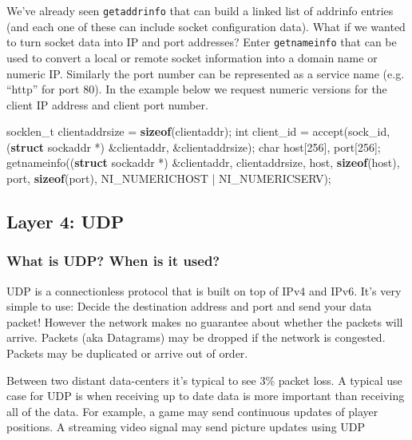 \documentclass[]{article}
\newenvironment{Shaded}{}{}
\newcommand{\KeywordTok}[1]{\textcolor[rgb]{0.00,0.44,0.13}{\textbf{{#1}}}}
\newcommand{\DataTypeTok}[1]{\textcolor[rgb]{0.56,0.13,0.00}{{#1}}}
\newcommand{\DecValTok}[1]{\textcolor[rgb]{0.25,0.63,0.44}{{#1}}}
\newcommand{\NormalTok}[1]{{#1}}
\begin{document}
We've already seen \texttt{getaddrinfo} that can build a linked list of
addrinfo entries (and each one of these can include socket configuration
data). What if we wanted to turn socket data into IP and port addresses?
Enter \texttt{getnameinfo} that can be used to convert a local or remote
socket information into a domain name or numeric IP. Similarly the port
number can be represented as a service name (e.g. ``http'' for port 80).
In the example below we request numeric versions for the client IP
address and client port number.

\begin{Shaded}
\begin{Highlighting}[]
\NormalTok{socklen_t clientaddrsize = }\KeywordTok{sizeof}\NormalTok{(clientaddr);}
\DataTypeTok{int} \NormalTok{client_id = accept(sock_id, (}\KeywordTok{struct} \NormalTok{sockaddr *) &clientaddr, &clientaddrsize);}
\DataTypeTok{char} \NormalTok{host[}\DecValTok{256}\NormalTok{], port[}\DecValTok{256}\NormalTok{];}
\NormalTok{getnameinfo((}\KeywordTok{struct} \NormalTok{sockaddr *) &clientaddr,}
      \NormalTok{clientaddrsize, host, }\KeywordTok{sizeof}\NormalTok{(host), port, }\KeywordTok{sizeof}\NormalTok{(port),}
      \NormalTok{NI_NUMERICHOST | NI_NUMERICSERV);}
\end{Highlighting}
\end{Shaded}

\subsection{Layer 4: UDP}\label{layer-4-udp}

\subsubsection{What is UDP? When is it
used?}\label{what-is-udp-when-is-it-used}

UDP is a connectionless protocol that is built on top of IPv4 and IPv6.
It's very simple to use: Decide the destination address and port and
send your data packet! However the network makes no guarantee about
whether the packets will arrive. Packets (aka Datagrams) may be dropped
if the network is congested. Packets may be duplicated or arrive out of
order.

Between two distant data-centers it's typical to see 3\% packet loss. A
typical use case for UDP is when receiving up to date data is more
important than receiving all of the data. For example, a game may send
continuous updates of player positions. A streaming video signal may
send picture updates using UDP
\end{document}
